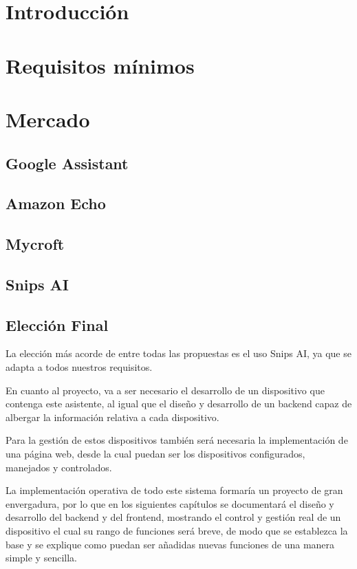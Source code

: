 \section{Introducción}


\section{Requisitos mínimos}


\section{Mercado}
\label{mercato}


    \subsection{Google Assistant}
    
    
    \subsection{Amazon Echo}
    
    
    \subsection{Mycroft}\label{Microft}
    
    
    \subsection{Snips AI}
    
    
    \subsection{Elección Final}

La elección más acorde de entre todas las propuestas es el uso Snips AI, ya que se adapta a todos nuestros requisitos.

En cuanto al proyecto, va a ser necesario el desarrollo de un dispositivo que contenga este asistente, al igual que el diseño y desarrollo de un backend capaz de albergar la información relativa a cada dispositivo.

Para la gestión de estos dispositivos también será necesaria la implementación de una página web, desde la cual puedan ser los dispositivos configurados, manejados y controlados.

La implementación operativa de todo este sistema formaría un proyecto de gran envergadura, por lo que en los siguientes capítulos se documentará el diseño y desarrollo del backend y del frontend, mostrando el control y gestión real de un dispositivo el cual su rango de funciones será breve, de modo que se establezca la base y se explique como puedan ser añadidas nuevas funciones de una manera simple y sencilla.
